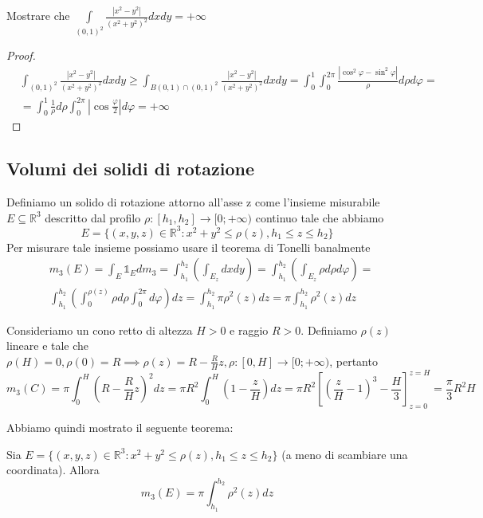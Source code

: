 \begin{exercise}
	Mostrare che $\int\limits_{(0,1)^2} \frac{|x^2 - y^2|}{(x^2 + y^2)^2}dxdy = +\infty$
\end{exercise}
\begin{proof}
	\begin{align*}
	&\int_{(0,1)^2} \frac{|x^2 - y^2|}{(x^2 + y^2)^2}dxdy \geq \int_{B(0,1) \cap (0,1)^2} \frac{|x^2 - y^2|}{(x^2 + y^2)^2} dxdy = \int_{0}^1 \int_0^{2\pi} \frac{|\cos^2{\varphi} - \sin^2{\varphi}|}{\rho} d\rho d\varphi = \\
	&=\int_0^{1} \frac{1}{\rho} d\rho \int_0^{2\pi} |\cos{\frac{\varphi}{2}}| d\varphi = +\infty
	\end{align*}
\end{proof}
\subsection{Volumi dei solidi di rotazione}
Definiamo un solido di rotazione attorno all'asse z come l'insieme misurabile $E \subseteq \mathbb{R}^3$ descritto dal profilo $\rho: [h_1, h_2] \to [0; +\infty)$ continuo tale che abbiamo
$$
E = \{(x, y, z) \in \mathbb{R}^3 : x^2 + y^2 \leq \rho(z), h_1 \leq z \leq h_2 \}
$$
Per misurare tale insieme possiamo usare il teorema di Tonelli banalmente
\begin{align*}
&m_3(E) = \int_E \mathbb{1}_E dm_3 = \int_{h_1}^{h_2} \left( \int_{E_z} dxdy \right) = \int_{h_1}^{h_2} \left( \int_{E_z} \rho d\rho d\varphi \right) = \\
&\int_{h_1}^{h_2} \left( \int_0^{\rho(z)} \rho d\rho \int_0^{2\pi} d\varphi \right)dz = \int_{h_1}^{h_2} \pi \rho^2(z) dz = \pi \int_{h_1}^{h_2} \rho^2(z) dz
\end{align*}
\begin{example}
Consideriamo un cono retto di altezza $H > 0$ e raggio $R > 0$. Definiamo $\rho(z)$ lineare e tale che $\rho(H) = 0, \rho(0) = R \implies \rho(z) = R - \frac{R}{H}z, \rho: [0, H] \to [0; +\infty)$, pertanto
$$
m_3(C) = \pi \int_0^H \left( R - \frac{R}{H}z \right)^2 dz = \pi R^2 \int_0^H \left(1-\frac{z}{H} \right)dz = \pi R^2 \left[ \left(\frac{z}{H} - 1 \right)^3 - \frac{H}{3} \right]^{z=H}_{z=0} = \frac{\pi}{3} R^2 H
$$
\end{example}
Abbiamo quindi mostrato il seguente teorema:
\begin{theorem}
	Sia $E = \{(x, y, z) \in \mathbb{R}^3 : x^2 + y^2 \leq \rho(z), h_1 \leq z \leq h_2 \}$ (a meno di scambiare una coordinata). Allora
	$$
	m_3(E) = \pi \int_{h_1}^{h_2} \rho^2(z)dz
	$$
\end{theorem}
